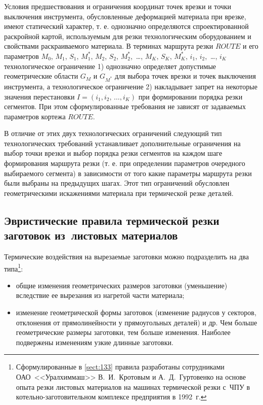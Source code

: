 \documentclass[11pt,twoside,openany]{report}
\begin{document}
Условия предшествования и ограничения координат точек врезки
и точки выключения инструмента,
обусловленные деформацией материала при врезке,
имеют статический характер,
т. е. однозначно определяются спроектированной раскройной картой,
используемым для резки технологическим оборудованием
и свойствами раскраиваемого материала.
В терминах маршрута резки $ROUTE$
и его параметров
$M_0$, $M_1$, $S_1$, $M_1^*$, $M_2$, $S_2$, $M_2^*$, \,\dots, $M_K$, $S_K$, $M_K^*$,
$i_1$, $i_2$, \,\dots, $i_K$
технологическое ограничение
1) однозначно определяет допустимые геометрические области
$G_M$
и
$G_{M^*}$
для выбора точек врезки и точек выключения инструмента,
а технологическое ограничение
2) накладывает запрет на некоторые значения перестановки
$ I = (i_1, i_2, \,\dots, i_K)$
при формировании порядка резки сегментов.
При этом сформулированные требования не зависят от задаваемых параметров кортежа
$ROUTE$.

В отличие от этих двух технологических ограничений
следующий тип технологических требований устанавливает
дополнительные ограничения на выбор точки врезки и выбор
порядка резки сегментов на каждом шаге формирования маршрута резки
(т. е. при определении параметров очередного выбираемого сегмента)
в зависимости от того какие параметры маршрута резки были выбраны на предыдущих шагах.
Этот тип ограничений обусловлен геометрическими
искажениями материала при термической резке деталей.

{\raggedright\subsection{
  Эвристические правила термической резки заготовок
  из~листовых материалов
}}
\label{sect:133}

Термические воздействия на вырезаемые заготовки можно подразделить на два типа\footnote{
  Сформулированные в \ref{sect:133}
  правила разработаны сотрудниками ОАО~<<Уралхиммаш>>
  В.~И.~Кротовым и А.~Д.~Гуртовенко на основе опыта
  резки листовых материалов на машинах термической резки с~ЧПУ
  в котельно-заготовительном комплексе предприятия в 1992~г.
}:

\begin{itemize}
\item
общие изменения геометрических размеров заготовки (уменьшение)
вследствие ее вырезания из нагретой части материала;
\item
изменение геометрической формы заготовок
(изменение радиусов у секторов,
отклонения от прямолинейности у прямоугольных деталей) и др.
Чем больше геометрические размеры заготовки,
тем больше изменения.
Наиболее  подвержены изменениям узкие длинные заготовки.
\end{itemize}
\end{document}
